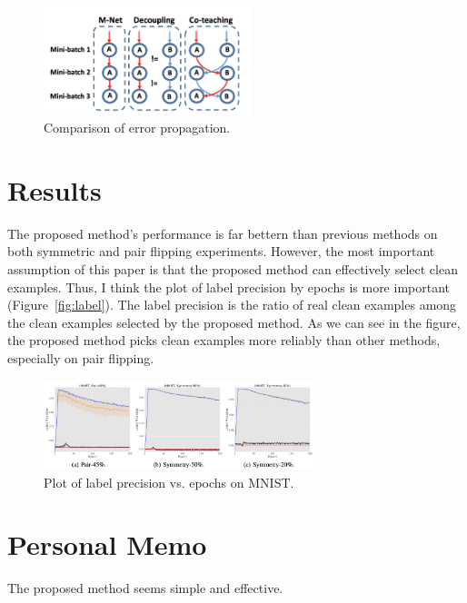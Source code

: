 \documentclass[10pt,twocolumn,letterpaper]{article}
\begin{document}
 \begin{figure}[b]
	\centering
	\includegraphics[width=6cm]{figures/coteaching.png}
	\caption{Comparison of error propagation.}
\end{figure}\label{fig:error}

\section{Results}
The proposed method's performance is far bettern than previous methods on both symmetric and pair flipping experiments. However, the most important assumption of this paper is that the proposed method can effectively select clean examples. Thus, I think the plot of label precision by epochs is more important (Figure~\ref{fig:label}). The label precision is the ratio of real clean examples among the clean examples selected by the proposed method. As we can see in the figure, the proposed method picks clean examples more reliably than other methods, especially on pair flipping.

 \begin{figure}[t]
	\centering
	\includegraphics[width=8cm]{figures/labelprecision.png}
	\caption{Plot of label precision vs. epochs on MNIST.}
\end{figure}\label{fig:label}

\section{Personal Memo}
The proposed method seems simple and effective.

{\small

% 
}
\end{document}

